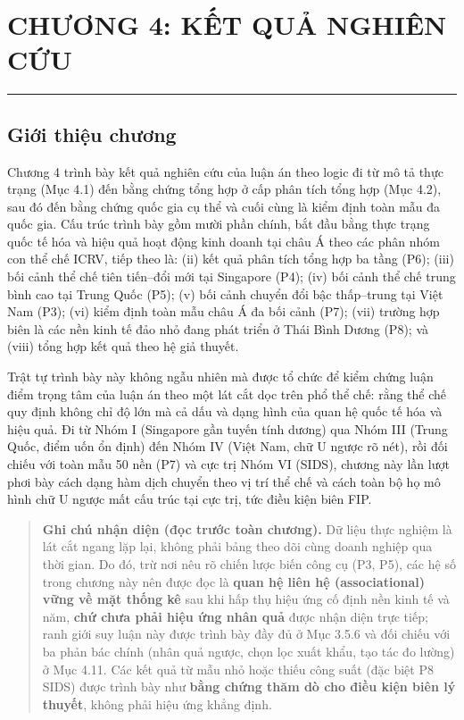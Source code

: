 \documentclass[
  a4paper,
  13pt]{extreport}
\author{}
\date{}
\begin{document}
\hypertarget{chux1b0ux1a1ng-4-kux1ebft-quux1ea3-nghiuxean-cux1ee9u}{%
\chapter{CHƯƠNG 4: KẾT QUẢ NGHIÊN
CỨU}\label{chux1b0ux1a1ng-4-kux1ebft-quux1ea3-nghiuxean-cux1ee9u}}

\begin{center}\rule{0.5\linewidth}{0.5pt}\end{center}

\hypertarget{giux1edbi-thiux1ec7u-chux1b0ux1a1ng}{%
\section{Giới thiệu chương}\label{giux1edbi-thiux1ec7u-chux1b0ux1a1ng}}

Chương 4 trình bày kết quả nghiên cứu của luận án theo logic đi từ mô tả
thực trạng (Mục 4.1) đến bằng chứng tổng hợp ở cấp phân tích tổng hợp
(Mục 4.2), sau đó đến bằng chứng quốc gia cụ thể và cuối cùng là kiểm
định toàn mẫu đa quốc gia. Cấu trúc trình bày gồm mười phần chính, bắt
đầu bằng thực trạng quốc tế hóa và hiệu quả hoạt động kinh doanh tại
châu Á theo các phân nhóm con thể chế ICRV, tiếp theo là: (ii) kết quả
phân tích tổng hợp ba tầng (P6); (iii) bối cảnh thể chế tiên tiến--đổi
mới tại Singapore (P4); (iv) bối cảnh thể chế trung bình cao tại Trung
Quốc (P5); (v) bối cảnh chuyển đổi bậc thấp--trung tại Việt Nam (P3);
(vi) kiểm định toàn mẫu châu Á đa bối cảnh (P7); (vii) trường hợp biên
là các nền kinh tế đảo nhỏ đang phát triển ở Thái Bình Dương (P8); và
(viii) tổng hợp kết quả theo hệ giả thuyết.

Trật tự trình bày này không ngẫu nhiên mà được tổ chức để kiểm chứng
luận điểm trọng tâm của luận án theo một lát cắt dọc trên phổ thể chế:
rằng thể chế quy định không chỉ độ lớn mà cả dấu và dạng hình của quan
hệ quốc tế hóa và hiệu quả. Đi từ Nhóm I (Singapore gần tuyến tính
dương) qua Nhóm III (Trung Quốc, điểm uốn ổn định) đến Nhóm IV (Việt
Nam, chữ U ngược rõ nét), rồi đối chiếu với toàn mẫu 50 nền (P7) và cực
trị Nhóm VI (SIDS), chương này lần lượt phơi bày cách dạng hàm dịch
chuyển theo vị trí thể chế và cách toàn bộ họ mô hình chữ U ngược mất
cấu trúc tại cực trị, tức điều kiện biên FIP.

\begin{quote}
\textbf{Ghi chú nhận diện (đọc trước toàn chương).} Dữ liệu thực nghiệm
là lát cắt ngang lặp lại, không phải bảng theo dõi cùng doanh nghiệp qua
thời gian. Do đó, trừ nơi nêu rõ chiến lược biến công cụ (P3, P5), các
hệ số trong chương này nên được đọc là \textbf{quan hệ liên hệ
(associational) vững về mặt thống kê} sau khi hấp thụ hiệu ứng cố định
nền kinh tế và năm, \textbf{chứ chưa phải hiệu ứng nhân quả} được nhận
diện trực tiếp; ranh giới suy luận này được trình bày đầy đủ ở Mục 3.5.6
và đối chiếu với ba phản bác chính (nhân quả ngược, chọn lọc xuất khẩu,
tạo tác đo lường) ở Mục 4.11. Các kết quả từ mẫu nhỏ hoặc thiếu công
suất (đặc biệt P8 SIDS) được trình bày như \textbf{bằng chứng thăm dò
cho điều kiện biên lý thuyết}, không phải hiệu ứng khẳng định.
\end{quote}
\end{document}
